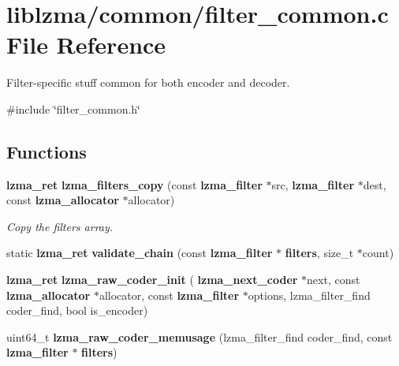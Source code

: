 \section{liblzma/common/filter\+\_\+common.c File Reference}
\label{filter__common_8c}


Filter-\/specific stuff common for both encoder and decoder.  


{\ttfamily \#include \char`\"{}filter\+\_\+common.\+h\char`\"{}}\newline
\subsection*{Functions}
\begin{DoxyCompactItemize}
\item 
\textbf{ lzma\+\_\+ret} \textbf{ lzma\+\_\+filters\+\_\+copy} (const \textbf{ lzma\+\_\+filter} $\ast$src, \textbf{ lzma\+\_\+filter} $\ast$dest, const \textbf{ lzma\+\_\+allocator} $\ast$allocator)
\begin{DoxyCompactList}\small\item\em Copy the filters array. \end{DoxyCompactList}\item 
\mbox{\label{filter__common_8c_a86c7af045ea6eac6133d22c110d43ca2}} 
static \textbf{ lzma\+\_\+ret} {\bfseries validate\+\_\+chain} (const \textbf{ lzma\+\_\+filter} $\ast$\textbf{ filters}, size\+\_\+t $\ast$count)
\item 
\mbox{\label{filter__common_8c_ae8e2c118f08911e9b2127541f0c560bf}} 
\textbf{ lzma\+\_\+ret} {\bfseries lzma\+\_\+raw\+\_\+coder\+\_\+init} (\textbf{ lzma\+\_\+next\+\_\+coder} $\ast$next, const \textbf{ lzma\+\_\+allocator} $\ast$allocator, const \textbf{ lzma\+\_\+filter} $\ast$options, lzma\+\_\+filter\+\_\+find coder\+\_\+find, bool is\+\_\+encoder)
\item 
\mbox{\label{filter__common_8c_a12438a58b047ffe81f8a5496421cc28c}} 
uint64\+\_\+t {\bfseries lzma\+\_\+raw\+\_\+coder\+\_\+memusage} (lzma\+\_\+filter\+\_\+find coder\+\_\+find, const \textbf{ lzma\+\_\+filter} $\ast$\textbf{ filters})
\end{DoxyCompactItemize}
